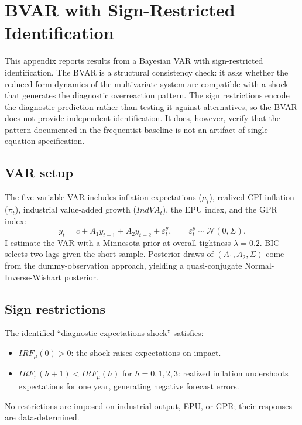\section{BVAR with Sign-Restricted Identification}\label{app:bvar}

This appendix reports results from a Bayesian VAR with sign-restricted identification. The BVAR is a structural consistency check: it asks whether the reduced-form dynamics of the multivariate system are compatible with a shock that generates the diagnostic overreaction pattern. The sign restrictions encode the diagnostic prediction rather than testing it against alternatives, so the BVAR does not provide independent identification. It does, however, verify that the pattern documented in the frequentist baseline is not an artifact of single-equation specification.

\subsection{VAR setup}

The five-variable VAR includes inflation expectations ($\mu_t$), realized CPI inflation ($\pi_t$), industrial value-added growth ($IndVA_t$), the EPU index, and the GPR index:
\begin{equation*}
  y_t = c + A_1 y_{t-1} + A_2 y_{t-2} + \varepsilon_t^y,
  \qquad \varepsilon_t^y \sim \mathcal{N}(0, \Sigma).
\end{equation*}
I estimate the VAR with a Minnesota prior \citep{Litterman1986} at overall tightness $\lambda = 0.2$. BIC selects two lags given the short sample. Posterior draws of $(A_1, A_2, \Sigma)$ come from the dummy-observation approach, yielding a quasi-conjugate Normal-Inverse-Wishart posterior.

\subsection{Sign restrictions}

The identified ``diagnostic expectations shock'' satisfies:
\begin{itemize}
  \item $IRF_{\mu}(0) > 0$: the shock raises expectations
    on impact.
  \item $IRF_{\pi}(h+1) < IRF_{\mu}(h)$ for
    $h = 0, 1, 2, 3$: realized inflation undershoots
    expectations for one year, generating negative
    forecast errors.
\end{itemize}
No restrictions are imposed on industrial output, EPU, or GPR; their responses are data-determined.

